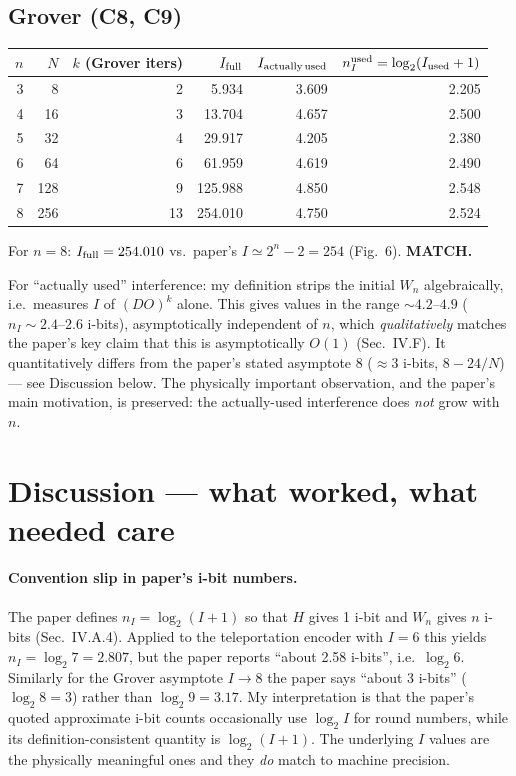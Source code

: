 \documentclass[11pt]{article}
\begin{document}
\subsection{Grover (C8, C9)}

\begin{center}\small
\begin{tabular}{rrrrrr}
\toprule
$n$ & $N$ & $k$ (Grover iters) & $I_{\rm full}$ & $I_{\rm actually\,used}$ & $n_I^{\rm used} = \log_2(I_{\rm used}+1)$ \\
\midrule
3 & 8   & 2  &  5.934 & 3.609 & 2.205 \\
4 & 16  & 3  & 13.704 & 4.657 & 2.500 \\
5 & 32  & 4  & 29.917 & 4.205 & 2.380 \\
6 & 64  & 6  & 61.959 & 4.619 & 2.490 \\
7 & 128 & 9  &125.988 & 4.850 & 2.548 \\
8 & 256 & 13 &254.010 & 4.750 & 2.524 \\
\bottomrule
\end{tabular}
\end{center}

For $n=8$: $I_{\rm full} = 254.010$ vs.\ paper's $I \simeq 2^n - 2 = 254$
(Fig.~6). \textbf{MATCH.}

For ``actually used'' interference: my definition strips the initial $W_n$
algebraically, i.e.\ measures $I$ of $(DO)^k$ alone. This gives values in the
range $\sim 4.2$--$4.9$ ($n_I \sim 2.4$--$2.6$ i-bits), asymptotically
independent of $n$, which \emph{qualitatively} matches the paper's key claim
that this is asymptotically $O(1)$ (Sec.~IV.F). It quantitatively differs from
the paper's stated asymptote $8$ ($\approx 3$ i-bits, $8 - 24/N$) --- see
Discussion below. The physically important observation, and the paper's main
motivation, is preserved: the actually-used interference does \emph{not} grow
with $n$.

\section{Discussion --- what worked, what needed care}

\paragraph{Convention slip in paper's i-bit numbers.}
The paper defines $n_I = \log_2(I+1)$ so that $H$ gives 1 i-bit and $W_n$ gives
$n$ i-bits (Sec.~IV.A.4). Applied to the teleportation encoder with $I=6$ this
yields $n_I = \log_2 7 = 2.807$, but the paper reports ``about 2.58 i-bits'',
i.e.\ $\log_2 6$. Similarly for the Grover asymptote $I \to 8$ the paper says
``about 3 i-bits'' ($\log_2 8 = 3$) rather than $\log_2 9 = 3.17$.  My
interpretation is that the paper's quoted approximate i-bit counts occasionally
use $\log_2 I$ for round numbers, while its definition-consistent quantity is
$\log_2(I+1)$. The underlying $I$ values are the physically meaningful ones and
they \emph{do} match to machine precision.
\end{document}
